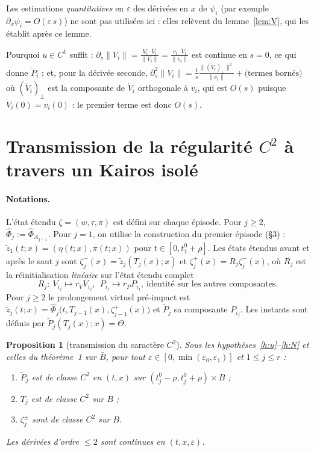 \documentclass[11pt,a4paper]{article}
\newtheorem{proposition}[theoreme]{Proposition}
\theoremstyle{remark}
\theoremstyle{definition}
\newcommand{\norm}[1]{\lVert #1\rVert}
\newcommand{\eps}{\varepsilon}
\newcommand{\zt}{\widetilde z}
\newcommand{\Pt}{\widetilde P}
\begin{document}
Les estimations \emph{quantitatives} en $\eps$ des dérivées en $x$ de $\psi_i$ (par exemple $\partial_x\psi_i=O(\eps\, s)$) ne sont pas utilisées ici : elles relèvent du lemme~\ref{lem:V}, qui les établit après ce lemme.

Pourquoi $u\in C^1$ suffit : $\partial_s\norm{V_i}=\frac{V_i\cdot\dot V_i}{\norm{V_i}}=\frac{v_i\cdot\dot V_i}{\norm{v_i}}$ est continue en $s=0$, ce qui donne $\ddot P_i$ ; et, pour la dérivée seconde, $\partial_s^2\norm{V_i}=\frac{1}{s}\frac{\norm{(\dot V_i)_\perp}^2}{\norm{v_i}}+\bigl(\text{termes bornés}\bigr)$ où $(\dot V_i)_\perp$ est la composante de $\dot V_i$ orthogonale à $v_i$, qui est $O(s)$ puisque $\dot V_i(0)=v_i(0)$ : le premier terme est donc $O(s)$.

\section{Transmission de la régularité $C^2$ à travers un Kairos isolé}

\paragraph{Notations.} L'état étendu $\zeta=(w,\tau,\pi)$ est défini sur chaque épisode. Pour $j\ge2$, $\hat\Phi_j:=\hat\Phi_{A_{j-1}}$. Pour $j=1$, on utilise la construction du premier épisode (§3) : $\zt_1(t;x)=(\eta(t;x),\pi(t;x))$ pour $t\in[0,t_1^0+\rho]$. Les états étendus avant et après le saut $j$ sont $\zeta^-_j(x)=\zt_j(T_j(x);x)$ et $\zeta^+_j(x)=R_j\zeta^-_j(x)$, où $R_j$ est la réinitialisation \emph{linéaire} sur l'état étendu complet
\[
R_j:\ V_{i_j}\mapsto r_VV_{i_j},\ \ P_{i_j}\mapsto r_PP_{i_j},\ \text{identité sur les autres composantes}.
\]
Pour $j\ge2$ le prolongement virtuel pré-impact est $\zt_j(t;x)=\hat\Phi_j\bigl(t,T_{j-1}(x),\zeta^+_{j-1}(x)\bigr)$ et $\Pt_j$ sa composante $P_{i_j}$. Les instants sont définis par $\Pt_j(T_j(x);x)=\Theta$.

\begin{proposition}[transmission du caractère $C^2$]\label{prop:T}
Sous les hypothèses~\ref{h:u}--\ref{h:N} et celles du théorème~1 sur $\bar B$, pour tout $\eps\in[0,\min(\eps_0,\eps_1)]$ et $1\le j\le r$ :
\begin{enumerate}[label=(\roman*)]
\item $\Pt_j$ est de classe $C^2$ en $(t,x)$ sur $(t_j^0-\rho,t_j^0+\rho)\times B$ ;
\item $T_j$ est de classe $C^2$ sur $B$ ;
\item $\zeta_j^\pm$ sont de classe $C^2$ sur $B$.
\end{enumerate}
Les dérivées d'ordre $\le2$ sont continues en $(t,x,\eps)$.
\end{proposition}
\end{document}
